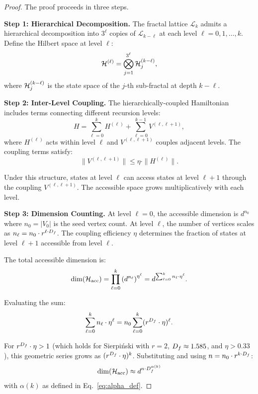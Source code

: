 \begin{proof}
The proof proceeds in three steps.

\textbf{Step 1: Hierarchical Decomposition.}
The fractal lattice $\mathcal{L}_k$ admits a hierarchical decomposition
into $3^{\ell}$ copies of $\mathcal{L}_{k-\ell}$ at each level
$\ell = 0, 1, \ldots, k$. Define the Hilbert space at level $\ell$:
\begin{equation}
\mathcal{H}^{(\ell)} = \bigotimes_{j=1}^{3^\ell} \mathcal{H}_j^{(k-\ell)},
\end{equation}
where $\mathcal{H}_j^{(k-\ell)}$ is the state space of the $j$-th
sub-fractal at depth $k - \ell$.

\textbf{Step 2: Inter-Level Coupling.}
The hierarchically-coupled Hamiltonian includes terms connecting
different recursion levels:
\begin{equation}
H = \sum_{\ell=0}^{k} H^{(\ell)} + \sum_{\ell=0}^{k-1} V^{(\ell, \ell+1)},
\end{equation}
where $H^{(\ell)}$ acts within level $\ell$ and $V^{(\ell, \ell+1)}$
couples adjacent levels. The coupling terms satisfy:
\begin{equation}
\| V^{(\ell, \ell+1)} \| \leq \eta \cdot \| H^{(\ell)} \|.
\end{equation}

Under this structure, states at level $\ell$ can access states at
level $\ell + 1$ through the coupling $V^{(\ell, \ell+1)}$. The
accessible space grows multiplicatively with each level.

\textbf{Step 3: Dimension Counting.}
At level $\ell = 0$, the accessible dimension is $d^{n_0}$ where
$n_0 = |V_0|$ is the seed vertex count. At level $\ell$, the
number of vertices scales as $n_\ell = n_0 \cdot r^{\ell \cdot D_f}$.
The coupling efficiency $\eta$ determines the fraction of states
at level $\ell + 1$ accessible from level $\ell$.

The total accessible dimension is:
\begin{equation}
\dim(\mathcal{H}_{\mathrm{acc}}) = \prod_{\ell=0}^{k}
\left( d^{n_\ell} \right)^{\eta^\ell}
= d^{\sum_{\ell=0}^{k} n_\ell \cdot \eta^\ell}.
\end{equation}

Evaluating the sum:
\begin{equation}
\sum_{\ell=0}^{k} n_\ell \cdot \eta^\ell = n_0 \sum_{\ell=0}^{k}
(r^{D_f} \cdot \eta)^\ell.
\end{equation}

For $r^{D_f} \cdot \eta > 1$ (which holds for Sierpi\'{n}ski with
$r = 2$, $D_f \approx 1.585$, and $\eta > 0.33$), this geometric
series grows as $(r^{D_f} \cdot \eta)^k$. Substituting and using
$n = n_0 \cdot r^{k \cdot D_f}$:
\begin{equation}
\dim(\mathcal{H}_{\mathrm{acc}}) \approx d^{n \cdot D_f^{\alpha(k)}}
\end{equation}
with $\alpha(k)$ as defined in Eq.~\eqref{eq:alpha_def}.
\end{proof}

